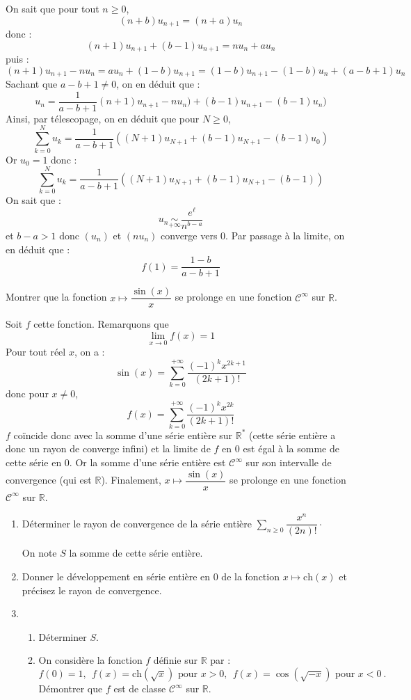 \documentclass[a4paper,10pt]{report}
\newcommand{\Sum}[2]{\ensuremath{\textstyle{\sum\limits_{#1}^{#2}}}}
\begin{document}
\begin{corr}
\begin{enumerate}
\medskip

\noindent On sait que pour tout $n \geq 0$,
$$ (n+b) u_{n+1} = (n+a) u_n$$
donc :
$$ (n+1) u_{n+1} + (b-1) u_{n+1} = n u_n + au_n $$
puis :
$$ (n+1) u_{n+1}- n u_n = a u_n + (1-b) u_{n+1} = (1-b) u_{n+1} - (1-b) u_n +  (a-b+1) u_n$$
Sachant que $a-b+1 \neq 0$, on en déduit que :
$$ u_n = \dfrac{1}{a-b+1} (n+1) u_{n+1}- n u_n ) + (b-1) u_{n+1} - (b-1) u_n)$$
Ainsi, par télescopage, on en déduit que pour $N \geq 0$,
$$ \sum_{k=0}^N u_k = \dfrac{1}{a-b+1}  ( (N+1) u_{N+1} +(b-1) u_{N+1} - (b-1)u_0 )$$
Or $u_0=1$ donc : 
$$  \sum_{k=0}^N u_k = \dfrac{1}{a-b+1}  ( (N+1) u_{N+1} +(b-1) u_{N+1} - (b-1))$$
On sait que :
$$ u_n \underset{+ \infty}{\sim} \dfrac{e^{\ell}}{n^{b-a}}$$
et $b-a>1$ donc $(u_n)$ et $(nu_n)$ converge vers $0$. Par passage à la limite, on en déduit que :
$$ f(1) = \dfrac{1-b}{a-b+1}$$
\end{enumerate}
\end{corr}



\begin{Exercice}{} Montrer que la fonction $x \mapsto \dfrac{\sin(x)}{x}$ se prolonge en une fonction $\mathcal{C}^{\infty}$ sur $\mathbb{R}$.
\end{Exercice}

\corr Soit $f$ cette fonction. Remarquons que 
$$ \lim_{x \rightarrow 0} f(x) = 1$$
Pour tout réel $x$, on a :
$$ \sin(x) = \sum_{k=0}^{+ \infty} \dfrac{(-1)^k x^{2k+1}}{(2k+1)!}$$
donc pour $x \neq 0$,
$$ f(x) = \sum_{k=0}^{+ \infty} \dfrac{(-1)^k x^{2k}}{(2k+1)!}$$
$f$ coïncide donc avec la somme d'une série entière sur $\mathbb{R}^*$ (cette série entière a donc un rayon de converge infini) et la limite de $f$ en $0$ est égal à la somme de cette série en $0$. Or la somme d'une série entière est $\mathcal{C}^{\infty}$ sur son intervalle de convergence (qui est $\mathbb{R}$). Finalement, $x \mapsto \dfrac{\sin(x)}{x}$ se prolonge en une fonction $\mathcal{C}^{\infty}$ sur $\mathbb{R}$.

\begin{Exercice}{} \begin{enumerate}
\item Déterminer le rayon de convergence de la série entière $\Sum{n \geq 0}{} \dfrac{x^n}{(2n)!} \cdot$

\noindent On note $S$ la somme de cette série entière.
\item Donner le développement en série entière en 0 de la fonction $x\mapsto \text{ch}(x)$  et précisez le rayon de convergence.
\item \begin{enumerate}
	\item Déterminer $S$.
	\item On considère la fonction $f$ définie sur $\mathbb{R}$ par :
	\begin{equation*}
	f(0)=1,\ \ f(x)=\text{ch}(\sqrt x)\text{ pour $x>0$},\ \ f(x)=\cos(\sqrt{-x})\text{ pour $x<0$}\ .
	\end{equation*}
	Démontrer que $f$ est de classe $\mathcal{C}^{\infty}$ sur $\mathbb{R}$.
	\end{enumerate}
\end{enumerate}
\end{Exercice}
\end{document}
